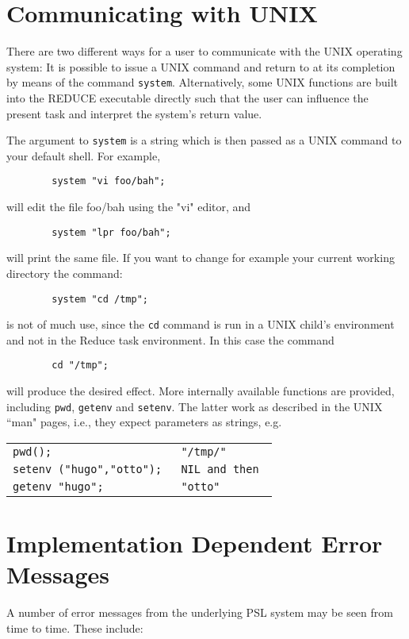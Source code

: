 \section{Communicating with UNIX}

There are two different ways for a {\REDUCE} user to communicate with the
UNIX operating system:
It is possible to issue a UNIX command and return to
{\REDUCE} at its completion by means of the command {\tt system}. 
Alternatively, some UNIX functions are built into the REDUCE executable
directly such that the user can influence the present task and interpret
the system's return value.

The argument to {\tt system} is a string which is then passed as a UNIX
command to your default shell.  For example,
\begin{verbatim}
        system "vi foo/bah";
\end{verbatim}
will edit the file foo/bah using the "vi" editor, and
\begin{verbatim}
        system "lpr foo/bah";
\end{verbatim}
will print the same file. If you want to change for example your current
working directory the command:
\begin{verbatim}
        system "cd /tmp";
\end{verbatim}
is not of much use, since the {\tt cd} command is run in a UNIX child's
environment and not in the Reduce task environment.  In this case the
command
\begin{verbatim}
        cd "/tmp";
\end{verbatim}
will produce the desired effect. More internally available functions
are provided, including {\tt pwd}, {\tt getenv} and {\tt setenv}.
The latter work as described in the UNIX
``man" pages, i.e., they expect parameters as strings, e.g.
\begin{center}
\begin{tabular}{l@{\rm\quad returns }l}
\tt pwd();                   & \tt "/tmp/"   \\
\tt setenv ("hugo","otto");  & \tt NIL  \rm and then \\
\tt getenv "hugo";           & \tt "otto"
\end{tabular}
\end{center}

\section{Implementation Dependent Error Messages}
A number of error messages from the underlying PSL system may be seen from
time to time.  These include:

